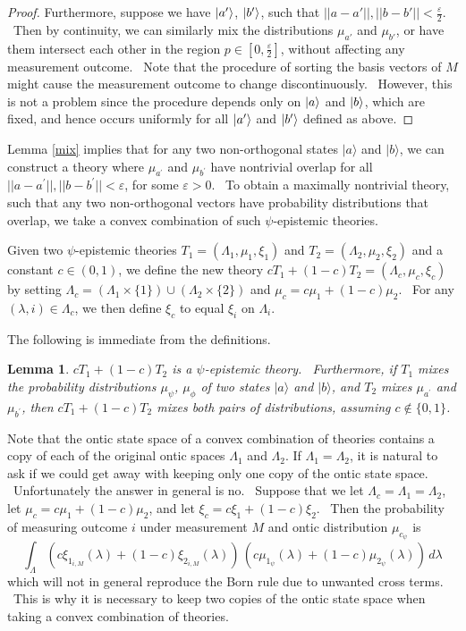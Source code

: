 \documentclass[letterpaper,11pt]{article}
\newtheorem{lem}{Lemma}
\newcommand{\ket}[1]{\mbox{$ | #1 \rangle $}}
\begin{document}
\begin{proof}
Furthermore, suppose we have $\ket{a'}$, $\ket{b'}$, such that $||a-a'||, ||b-b'||<\frac{\varepsilon}{2}$. \ Then by continuity, we can similarly mix the distributions $\mu_{a'}$ and $\mu_{b'}$, or have them intersect each other in the region $p\in[0,\frac{\varepsilon}{2}]$, without affecting any measurement outcome. \ Note that the procedure of sorting the basis vectors of $M$ might cause the measurement outcome to change discontinuously. \ However, this is not a problem since the procedure depends only on $\ket{a}$ and $\ket{b}$, which are fixed, and hence occurs uniformly for all $\ket{a'}$ and $\ket{b'}$ defined as above.
\end{proof}

Lemma \ref{mix} implies that for any two non-orthogonal states $ |
a \rangle $ and $ | b \rangle $, we can construct a theory
where $\mu_{a^{\prime }}$ and $\mu_{b^{\prime }}$ have nontrivial
overlap for all $||a-a^{\prime }||, ||b-b^{\prime }||<\varepsilon$,
for some $\varepsilon>0$. \ To obtain a maximally nontrivial theory, such that
any two non-orthogonal vectors have probability distributions that overlap,
we take a convex combination of such $\psi$-epistemic theories.

Given two $\psi$-epistemic theories $T_1=(\Lambda_1,\mu_1,\xi_1)$ and $%
T_2=(\Lambda_2,\mu_2,\xi_2)$ and a constant $c\in(0,1)$, we define the new
theory $cT_1+(1-c)T_2=(\Lambda_c,\mu_c,\xi_c)$ by setting $%
\Lambda_c=\left(\Lambda_1 \times \{1\} \right) \cup \left(\Lambda_2 \times
\{2\} \right)$ and $\mu_c = c\mu_1 + (1-c)\mu_2$. \ For any $%
(\lambda,i)\in\Lambda_c$, we then define $\xi_c$ to equal $\xi_i$ on $%
\Lambda_i$.

The following is immediate from the definitions.

\begin{lem}
\label{convex} $cT_1+(1-c)T_2$ is a $\psi$-epistemic theory. \ Furthermore,
if $T_1$ mixes the probability distributions $\mu_{\psi}$, $\mu_{\phi}$ of
two states $ | a \rangle $ and $ | b \rangle $, and $%
T_2$ mixes $\mu_{a^{\prime }}$ and $\mu_{b^{\prime }}$, then $%
cT_1+(1-c)T_2$ mixes both pairs of distributions, assuming $c\not\in\{0,1\}$.
\end{lem}


Note that the ontic state space of a convex combination of theories contains a copy of each of the original ontic spaces $\Lambda_1$ and $\Lambda_2$. If $\Lambda_1 =\Lambda_2$, it is natural to ask if we could get away with keeping only one copy of the ontic state space. \ Unfortunately the answer in general is no. \ Suppose that we let $\Lambda_c= \Lambda_1 =\Lambda_2$, let $\mu_c = c\mu_1 + (1-c)\mu_2$, and let $\xi_c = c\xi_1 + (1-c)\xi_2$. \ Then the probability of measuring outcome $i$ under measurement $M$ and ontic distribution $\mu_{c_\psi}$ is
\[\int_\Lambda \left(c\xi_{1_{i,M}}(\lambda)+(1-c)\xi_{2_{i,M}}(\lambda)\right)\,\left(c\mu_{1_\psi}(\lambda)+(1-c)\mu_{2_\psi}(\lambda)\right)\,d\lambda   \]
which will not in general reproduce the Born rule due to unwanted cross terms. \ This is why it is necessary to keep two copies of the ontic state space when taking a convex combination of theories.
\end{document}
